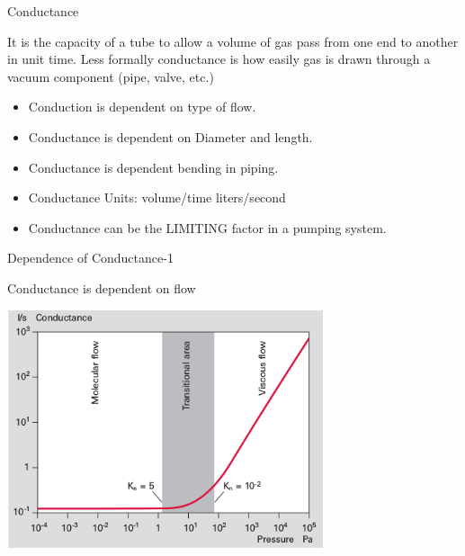 \documentclass[11]{beamer}
\begin{document}
\begin{frame}{Conductance}

It is the capacity of a tube to allow a volume of gas pass from one end to another in unit time.
Less formally conductance is how easily gas is drawn through a vacuum component (pipe, valve, etc.)

\begin{block}

 	\begin{itemize}
		\item Conduction is dependent on type of flow.
		\item Conductance is dependent on Diameter and length.
		\item Conductance is dependent bending in piping.
   	    \item  Conductance Units:  volume/time liters/second
   		\item  Conductance can be the LIMITING factor in a pumping system.

	\end{itemize}

\end{block}
   


\end{frame}


\begin{frame}{Dependence of Conductance-1}
 
 \begin{block}{Conductance is dependent on flow}
 	\begin{center}
		
		\includegraphics[width=0.7\textwidth]{CondVsPressureCurve.png}
		
	\end{center}
\end{block}
\end{frame}
\end{document}
